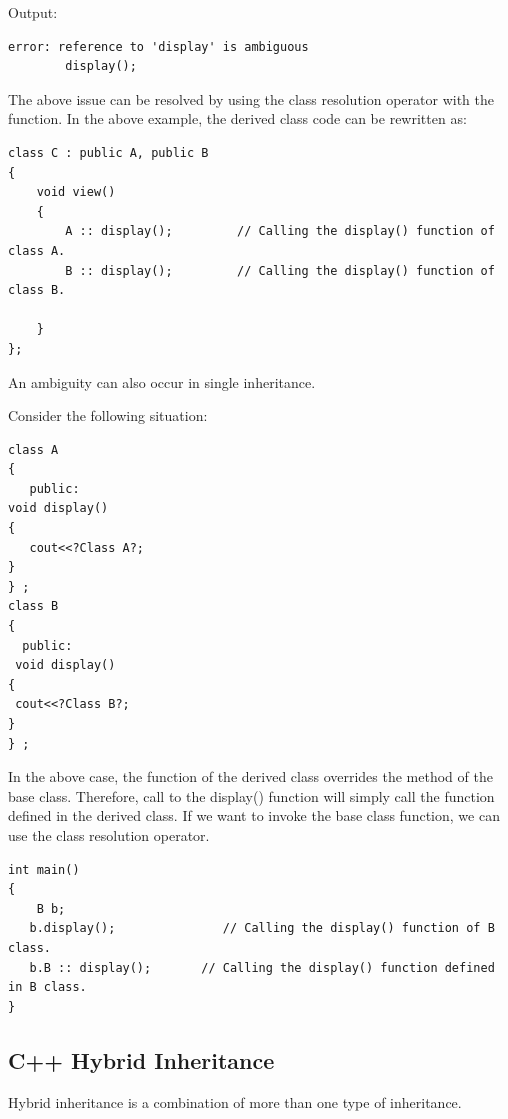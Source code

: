 \documentclass{book}
\begin{document}
Output:

\begin{verbatim}
error: reference to 'display' is ambiguous
        display();

\end{verbatim}

The above issue can be resolved by using the class resolution operator with the function. In the above example, the derived class code can be rewritten as:

\begin{lstlisting}
class C : public A, public B  
{  
    void view()  
    {  
        A :: display();         // Calling the display() function of class A.  
        B :: display();         // Calling the display() function of class B.  
  
    }  
};  
\end{lstlisting}

An ambiguity can also occur in single inheritance.

Consider the following situation:

\begin{lstlisting}
class A  
{  
   public:  
void display()  
{  
   cout<<?Class A?;  
}   
} ;  
class B  
{   
  public:  
 void display()  
{  
 cout<<?Class B?;  
}  
} ;  
\end{lstlisting}

In the above case, the function of the derived class overrides the method of the base class. Therefore, call to the display() function will simply call the function defined in the derived class. If we want to invoke the base class function, we can use the class resolution operator.

\begin{lstlisting}
int main()  
{  
    B b;  
   b.display();               // Calling the display() function of B class.  
   b.B :: display();       // Calling the display() function defined in B class.  
}   
\end{lstlisting}

\subsection{C++ Hybrid Inheritance}

Hybrid inheritance is a combination of more than one type of inheritance.
\end{document}
